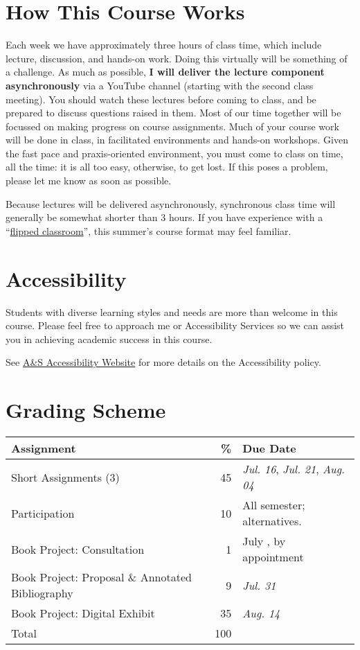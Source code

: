 \documentclass[11pt]{article}
\begin{document}
\section*{How This Course Works}
\label{sec:org786621a}
Each week we have approximately three hours of class time, which include lecture, discussion, and hands-on work. Doing this virtually will be something of a challenge. As much as possible, \textbf{I will deliver the lecture component asynchronously} via a YouTube channel (starting with the second class meeting). You should watch these lectures before coming to class, and be prepared to discuss questions raised in them. Most of our time together will be focussed on making progress on course assignments. Much of your course work will be done in class, in facilitated environments and hands-on workshops. Given the fast pace and praxis-oriented environment, you must come to class on time, all the time: it is all too easy, otherwise, to get lost. If this poses a problem, please let me know as soon as possible.

Because lectures will be delivered asynchronously, synchronous class time will generally be somewhat shorter than 3 hours. If you have experience with a ``\href{https://en.wikipedia.org/wiki/Flipped\_classroom}{flipped classroom}'', this summer's course format may feel familiar.

\section*{Accessibility}
\label{sec:org88746e2}
Students with diverse learning styles and needs are more than welcome in this course. Please feel free to approach me or Accessibility Services so we can assist you in achieving academic success in this course. 

See \href{http://www.studentlife.utoronto.ca/as}{A\&S Accessibility Website} for more details on the Accessibility policy.

\section*{Grading Scheme}
\label{sec:orgbb43134}
\begin{center}
\begin{tabular}{lrl}
\textbf{Assignment} & \textbf{\%} & \textbf{Due Date}\\
\hline
Short Assignments (3) & 45 & \textit{Jul. 16}, \textit{Jul. 21}, \textit{Aug. 04}\\
Participation & 10 & All semester; alternatives.\\
Book Project: Consultation & 1 & July , by appointment\\
Book Project: Proposal \& Annotated Bibliography & 9 & \textit{Jul. 31}\\
Book Project: Digital Exhibit & 35 & \textit{Aug. 14}\\
Total & 100 & \\
\end{tabular}
\end{center}
\end{document}
